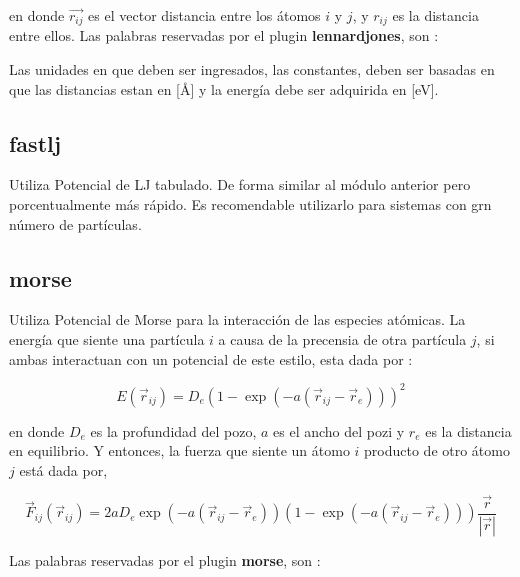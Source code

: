 en donde $\vec{r_{ij}}$ es el vector distancia entre los \'atomos $i$ y $j$, y $r_{ij}$ es la distancia entre ellos. 
Las palabras reservadas por el plugin \textbf{lennardjones}, son :


Las unidades en que deben ser ingresados, las constantes, deben ser basadas en que las distancias estan en [\AA] y la energ\'ia debe ser adquirida en [eV].


\subsection{fastlj}
Utiliza Potencial de LJ tabulado. De forma similar al m\'odulo anterior pero porcentualmente m\'as r\'apido. Es recomendable utilizarlo para sistemas con grn n\'umero de part\'iculas.

\subsection{morse}
Utiliza Potencial de Morse para la interacci\'on de las especies at\'omicas. La energ\'ia que siente una part\'icula $i$ a causa de la precensia de otra part\'icula $j$, si ambas interactuan con un potencial de este estilo, esta dada por :

$$E(\vec{r}_{ij}) = D_e\left(1-\exp(-a(\vec{r}_{ij}-\vec{r}_e))\right)^2$$

en donde $D_e$ es la profundidad del pozo, $a$ es el ancho del pozi y $r_e$ es la distancia en equilibrio. Y entonces, la fuerza que siente un \'atomo $i$ producto de otro \'atomo $j$ est\'a dada por,

$$\vec{F}_{ij} ( \vec{r}_{ij}) = 2aD_e\exp(-a(\vec{r}_{ij}-\vec{r}_e))\left(1-\exp(-a(\vec{r}_{ij}-\vec{r}_e))\right)\frac{\vec{r}}{|\vec{r}|}$$

Las palabras reservadas por el plugin \textbf{morse}, son :


